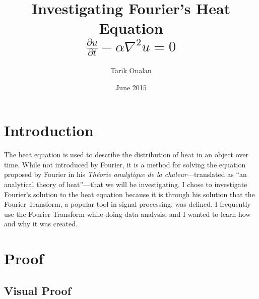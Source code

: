 \documentclass[a4paper,twocolumn]{article}
\title{Investigating Fourier's Heat Equation\\$\frac{\partial{u}}{\partial{t}}-\alpha\nabla^{2}u=0$}
\date{June 2015}
\author{Tarik Onalan}
\begin{document}
    \maketitle


    \tableofcontents


    \section{Introduction}

        The heat equation is used to describe the distribution of heat in an object over time. While
        not introduced by Fourier, it is a method for solving the equation proposed by Fourier in
        his \textit{Théorie analytique de la chaleur}---translated as ``an analytical theory of
        heat''---that we will be investigating. I chose to investigate Fourier's solution to the heat
        equation because it is through his solution that the Fourier Transform, a popular tool in signal
        processing, was defined. I frequently use the Fourier Transform while doing data analysis, and I
        wanted to learn how and why it was created.


    \section{Proof}

        \subsection{Visual Proof}


    \printbibliography
\end{document}
